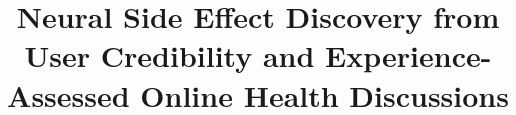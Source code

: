 \documentclass{bmcart}
\begin{document}
\begin{frontmatter}

\begin{fmbox}


\title{Neural Side Effect Discovery from User Credibility and Experience-Assessed Online Health Discussions}


\author[
   addressref={aff1},
   email={vhnguyen@u.nus.edu}
]{ }
\author[
   addressref={aff1},
   email={sugiyama@comp.nus.edu.sg}
]{ }
\author[
   addressref={aff1},
   email={kanmy@comp.nus.edu.sg}
]{ }

\author[
   addressref={aff1},
   email={kishaloy@comp.nus.edu.sg}
]{ }


\end{fmbox}
\end{frontmatter}
\end{document}
